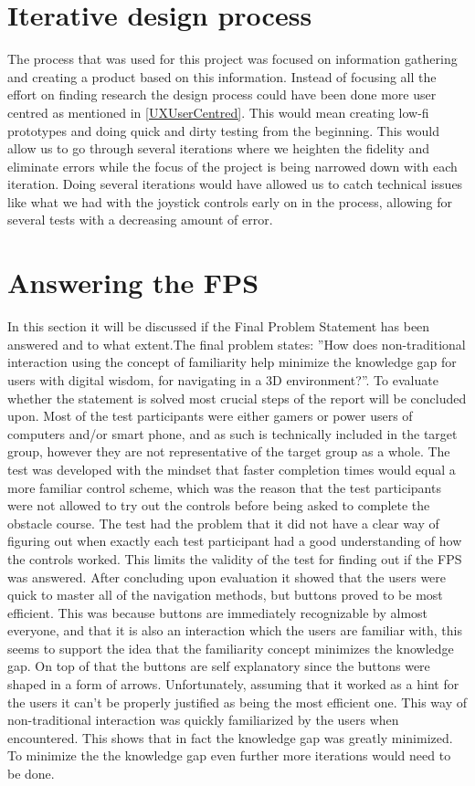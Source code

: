 \section*{Iterative design process}
The process that was used for this project was focused on information gathering and creating a product based on this information.
Instead of focusing all the effort on finding research the design process could have been done more user centred as mentioned in \ref{UXUserCentred}.
This would mean creating low-fi prototypes and doing quick and dirty testing from the beginning. This would allow us to go through several iterations where we heighten the fidelity and eliminate errors while the focus of the project is being narrowed down with each iteration. Doing several iterations would have allowed us to catch technical issues like what we had with the joystick controls early on in the process, allowing for several tests with a decreasing amount of error.
\section*{Answering the FPS}
In this section it will be discussed if the Final Problem Statement has been answered and to what extent.The final problem states: ”How does non-traditional interaction using the concept of familiarity help minimize the knowledge gap for users with digital wisdom, for navigating in a 3D environment?”. To evaluate whether the statement is solved most crucial steps of the report will be concluded upon. 
Most of the test participants were either gamers or power users of computers and/or smart phone, and as such is technically included in the target group, however they are not representative of the target group as a whole. 
The test was developed with the mindset that faster completion times would equal a more familiar control scheme, which was the reason that the test participants were not allowed to try out the controls before being asked to complete the obstacle course. The test had the problem that it did not have a clear way of figuring out when exactly each test participant had a good understanding of how the controls worked. This limits the validity of the test for finding out if the FPS was answered.
After concluding upon evaluation it showed that the users were quick to master all of the navigation methods, but buttons proved to be most efficient. This was because buttons are immediately recognizable by almost everyone, and that it is also an interaction which the users are familiar with, this seems to support the idea that the familiarity concept minimizes the knowledge gap. On top of that the buttons are self explanatory since the buttons were shaped in a form of arrows. Unfortunately, assuming that it worked as a hint for the users it can’t be properly justified as being the most efficient one. 
This way of non-traditional interaction was quickly familiarized by the users when encountered. This shows that in fact the knowledge gap was greatly minimized. To minimize the the knowledge gap even further more iterations would need to be done.